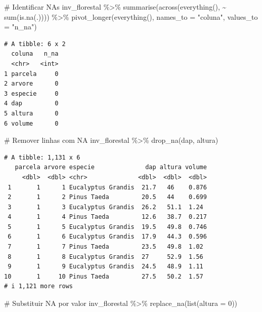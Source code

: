\documentclass[
  letterpaper,
]{scrbook}
\newenvironment{Shaded}{\begin{snugshade}}{\end{snugshade}}
\newcommand{\AttributeTok}[1]{\textcolor[rgb]{0.40,0.45,0.13}{#1}}
\newcommand{\CommentTok}[1]{\textcolor[rgb]{0.37,0.37,0.37}{#1}}
\newcommand{\DecValTok}[1]{\textcolor[rgb]{0.68,0.00,0.00}{#1}}
\newcommand{\FunctionTok}[1]{\textcolor[rgb]{0.28,0.35,0.67}{#1}}
\newcommand{\NormalTok}[1]{\textcolor[rgb]{0.00,0.23,0.31}{#1}}
\newcommand{\SpecialCharTok}[1]{\textcolor[rgb]{0.37,0.37,0.37}{#1}}
\newcommand{\StringTok}[1]{\textcolor[rgb]{0.13,0.47,0.30}{#1}}
\begin{document}
\begin{Shaded}
\begin{Highlighting}[]
\CommentTok{\# Identificar NAs}
\NormalTok{inv\_florestal }\SpecialCharTok{\%\textgreater{}\%} 
  \FunctionTok{summarise}\NormalTok{(}\FunctionTok{across}\NormalTok{(}\FunctionTok{everything}\NormalTok{(), }\SpecialCharTok{\textasciitilde{}} \FunctionTok{sum}\NormalTok{(}\FunctionTok{is.na}\NormalTok{(.)))) }\SpecialCharTok{\%\textgreater{}\%} 
  \FunctionTok{pivot\_longer}\NormalTok{(}\FunctionTok{everything}\NormalTok{(), }\AttributeTok{names\_to =} \StringTok{"coluna"}\NormalTok{, }\AttributeTok{values\_to =} \StringTok{"n\_na"}\NormalTok{)}
\end{Highlighting}
\end{Shaded}

\begin{verbatim}
# A tibble: 6 x 2
  coluna   n_na
  <chr>   <int>
1 parcela     0
2 arvore      0
3 especie     0
4 dap         0
5 altura      0
6 volume      0
\end{verbatim}

\begin{Shaded}
\begin{Highlighting}[]
\CommentTok{\# Remover linhas com NA}
\NormalTok{inv\_florestal }\SpecialCharTok{\%\textgreater{}\%} \FunctionTok{drop\_na}\NormalTok{(dap, altura)}
\end{Highlighting}
\end{Shaded}

\begin{verbatim}
# A tibble: 1,131 x 6
   parcela arvore especie              dap altura volume
     <dbl>  <dbl> <chr>              <dbl>  <dbl>  <dbl>
 1       1      1 Eucalyptus Grandis  21.7   46    0.876
 2       1      2 Pinus Taeda         20.5   44    0.699
 3       1      3 Eucalyptus Grandis  26.2   51.1  1.24 
 4       1      4 Pinus Taeda         12.6   38.7  0.217
 5       1      5 Eucalyptus Grandis  19.5   49.8  0.746
 6       1      6 Eucalyptus Grandis  17.9   44.3  0.596
 7       1      7 Pinus Taeda         23.5   49.8  1.02 
 8       1      8 Eucalyptus Grandis  27     52.9  1.56 
 9       1      9 Eucalyptus Grandis  24.5   48.9  1.11 
10       1     10 Pinus Taeda         27.5   50.2  1.57 
# i 1,121 more rows
\end{verbatim}

\begin{Shaded}
\begin{Highlighting}[]
\CommentTok{\# Substituir NA por valor}
\NormalTok{inv\_florestal }\SpecialCharTok{\%\textgreater{}\%} \FunctionTok{replace\_na}\NormalTok{(}\FunctionTok{list}\NormalTok{(}\AttributeTok{altura =} \DecValTok{0}\NormalTok{))}
\end{Highlighting}
\end{Shaded}
\end{document}
